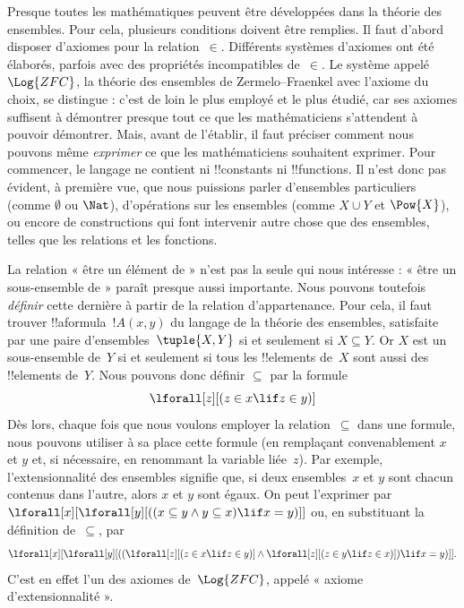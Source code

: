 \documentclass[../../../include/open-logic-section]{subfiles}
\begin{document}


Presque toutes les mathématiques peuvent être développées dans la
théorie des ensembles. Pour cela, plusieurs conditions doivent être
remplies. Il faut d'abord disposer d'axiomes pour la relation~$\in$.
Différents systèmes d'axiomes ont été élaborés, parfois avec des
propriétés incompatibles de~$\in$. Le système appelé $\Log{ZFC}$,
la théorie des ensembles de Zermelo--Fraenkel avec l'axiome du choix,
se distingue : c'est de loin le plus employé et le plus étudié, car
ses axiomes suffisent à démontrer presque tout ce que les
mathématiciens s'attendent à pouvoir démontrer. Mais, avant de
l'établir, il faut préciser comment nous pouvons même \emph{exprimer}
ce que les mathématiciens souhaitent exprimer. Pour commencer, le
langage ne contient ni !!{constant}s ni !!{function}s. Il n'est donc
pas évident, à première vue, que nous puissions parler d'ensembles
particuliers (comme $\emptyset$ ou $\Nat$), d'opérations sur les
ensembles (comme $X \cup Y$ et $\Pow{X}$), ou encore de constructions
qui font intervenir autre chose que des ensembles, telles que les
relations et les fonctions.

La relation « être un élément de » n'est pas la seule qui nous
intéresse : « être un sous-ensemble de » paraît presque aussi
importante. Nous pouvons toutefois \emph{définir} cette dernière à
partir de la relation d'appartenance. Pour cela, il faut trouver
!!a{formula}~$!A(x, y)$ du langage de la théorie des ensembles,
satisfaite par une paire d'ensembles~$\tuple{X, Y}$ si et seulement
si $X \subseteq Y$. Or $X$ est un sous-ensemble de~$Y$ si et
seulement si tous les !!{element}s de~$X$ sont aussi des
!!{element}s de~$Y$. Nous pouvons donc définir $\subseteq$ par la
formule
\[
\lforall[z][(z \in x \lif z \in y)]
\]
Dès lors, chaque fois que nous voulons employer la relation~$\subseteq$
dans une formule, nous pouvons utiliser à sa place cette formule
(en remplaçant convenablement $x$ et $y$ et, si nécessaire, en
renommant la variable liée~$z$). Par exemple, l'extensionnalité des
ensembles signifie que, si deux ensembles~$x$ et $y$ sont chacun
contenus dans l'autre, alors $x$ et $y$ sont égaux. On peut l'exprimer par
$\lforall[x][\lforall[y][((x \subseteq y \land y
    \subseteq x) \lif x = y)]]$ ou, en substituant la définition
de~$\subseteq$, par
\[
\lforall[x][\lforall[y][((\lforall[z][(z \in x \lif z \in y)] \land
    \lforall[z][(z \in y \lif z \in x)]) \lif x = y)]].
\]
C'est en effet l'un des axiomes de~$\Log{ZFC}$, appelé
« axiome d'extensionnalité ».
\end{document}
